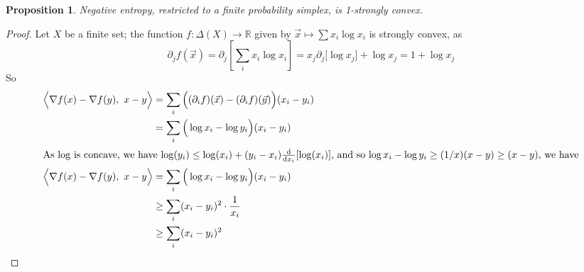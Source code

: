 \documentclass[letterpaper]{article} %
\theoremstyle{plain}
\newtheorem{prop}[theorem]{Proposition}
\theoremstyle{definition}
\theoremstyle{remark}
\begin{document}
{%
\begin{prop}\label{prop:neg-ent-convex}
  Negative entropy, restricted to a finite probability
			simplex, is 1-strongly convex. 
\end{prop}
\begin{proof}
	Let $X$ be a finite set; the function $f: \Delta(X) \to \mathbb R$ given by $\vec x \mapsto \sum x_i \log x_i$ is strongly convex, as 
	\begin{equation*}
		\partial_j f(\vec x) =  \partial_j\left[\sum_i x_i \log x_i \right] = 
			x_j \partial_j \big[\log x_j \big] + \log x_j = 1 + \log x_j
	\end{equation*}
	So
	\begin{align*}
		\Big\langle \nabla f(x) - \nabla f(y),~ x-y\Big\rangle 
			&= \sum_i \Big((\partial_i f)(\vec x) - (\partial_i f)(\vec y)\Big)(x_i - y_i) \\
			&= \sum_i \Big(\log x_i  - \log y_i \Big)(x_i - y_i) \\
		\intertext{As $\log$ is concave, we have $\log(y_i) \leq \log(x_i) + (y_i-x_i) \frac{\mathrm d}{\mathrm d x_i} [\log(x_i)]$, and so $\log x_i - \log y_i \geq (1/x) (x - y)  \geq (x-y)$, we have}
		\Big\langle \nabla f(x) - \nabla f(y),~ x-y\Big\rangle
			&= \sum_i \Big(\log x_i  - \log y_i \Big)(x_i - y_i) \\ %
			&\geq \sum_i (x_i-y_i)^2 \cdot \frac1{x_i}\\
			&\geq \sum_i (x_i-y_i)^2 \\

\end{align*}
\end{proof}}
\end{document}
